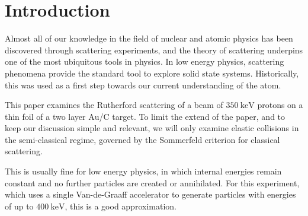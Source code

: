 \section{Introduction} 
Almost all of our knowledge in the field of nuclear and atomic physics has been discovered through scattering experiments, and the theory of scattering underpins one of the most ubiquitous tools in physics.
In low energy physics, scattering phenomena provide the standard tool to
explore solid state systems. Historically, this was used as a first step
towards our current understanding of the atom.

This paper examines the Rutherford scattering of a beam of
$\SI{350}{\kilo\electronvolt}$ protons on a thin foil of
a two layer $\mathrm{Au}$/$\mathrm{C}$ target. To limit the extend of the paper, and to
keep our discussion simple and relevant, we will only examine elastic
collisions in the semi-classical regime, governed by the Sommerfeld criterion
for classical scattering. \cite[p. 14]{noteBB}

This is usually fine for low energy physics, in which internal energies remain
constant and no further particles are created or annihilated.
For this experiment, which uses a single Van-de-Graaff accelerator to generate particles with energies of up to $\SI{400}{\kilo\electronvolt}$, this is a good approximation.

